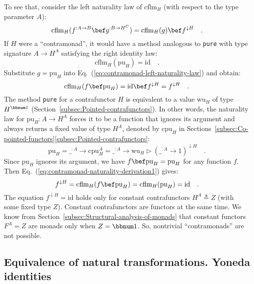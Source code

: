 To see that, consider the left naturality law of $\text{cflm}_{H}$
(with respect to the type parameter $A$):
\begin{equation}
\text{cflm}_{H}(f^{:A\rightarrow B}\bef g^{:B\rightarrow H^{C}})=\text{cflm}_{H}(g)\bef f^{\downarrow H}\quad.\label{eq:contramonad-left-naturality-law}
\end{equation}
If $H$ were a \textsf{``}contramonad\textsf{''}, it would have a method analogous
to \lstinline!pure! with type signature $A\rightarrow H^{A}$ satisfying
the right identity law:
\[
\text{cflm}_{H}(\text{pu}_{H})=\text{id}\quad.
\]
Substitute $g=\text{pu}_{H}$ into Eq.~(\ref{eq:contramonad-left-naturality-law})
and obtain:
\begin{equation}
\text{cflm}_{H}(f\bef\text{pu}_{H})=\text{id}\bef f^{\downarrow H}=f^{\downarrow H}\quad.\label{eq:contramonad-naturality-derivation1}
\end{equation}
The method \lstinline!pure! for a contrafunctor $H$ is equivalent
to a value $\text{wu}_{H}$ of type $H^{\bbnum 1}$ (Section~\ref{subsec:Pointed-contrafunctors}).
In other words, the naturality law for $\text{pu}_{H}:A\rightarrow H^{A}$
forces it to be a function that ignores its argument and always returns
a fixed value of type $H^{A}$, denoted by $\text{cpu}_{H}$ in Sections~\ref{subsec:Co-pointed-functors}\textendash \ref{subsec:Pointed-contrafunctors}:
\[
\text{pu}_{H}=\_^{:A}\rightarrow\text{cpu}_{H}^{A}=\_^{:A}\rightarrow\text{wu}_{H}\triangleright(\_^{:A}\rightarrow1)^{\downarrow H}\quad.
\]
Since $\text{pu}_{H}$ ignores its argument, we have $f\bef\text{pu}_{H}=\text{pu}_{H}$
for any function $f$. Then Eq.~(\ref{eq:contramonad-naturality-derivation1})
gives:
\[
f^{\downarrow H}=\text{cflm}_{H}(f\bef\text{pu}_{H})=\text{cflm}_{H}(\text{pu}_{H})=\text{id}\quad.
\]
The equation $f^{\downarrow H}=\text{id}$ holds only for constant
contrafunctors $H^{A}\triangleq Z$ (with some fixed type $Z$). Constant
contrafunctors are functors at the same time. We know from Section~\ref{subsec:Structural-analysis-of-monads}
that constant functors $F^{A}=Z$ are monads only when $Z=\bbnum 1$.
So, nontrivial \textsf{``}contramonads\textsf{''} are not possible. 

\subsection{Equivalence of natural transformations. Yoneda identities\label{subsec:Yoneda-identities}}

